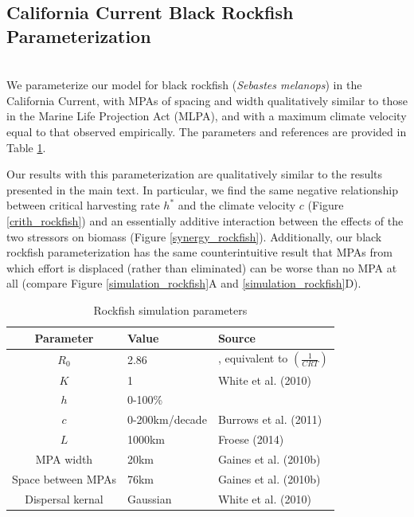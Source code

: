 \documentclass[12pt,english]{article}
\begin{document}
\subsection{California Current Black Rockfish Parameterization \label{rock}}
~\\We parameterize our model for black rockfish (\emph{Sebastes melanops}) in the California Current, with MPAs of spacing and width qualitatively similar to those in the Marine Life Projection Act (MLPA), and with a maximum climate velocity equal to that observed empirically. The parameters and references are provided in Table \ref{rockfish_params}.

Our results with this parameterization are qualitatively similar to the results presented in the main text. In particular, we find the same negative relationship between critical harvesting rate $h^*$ and the climate velocity $c$ (Figure \ref{crith_rockfish}) and an essentially additive interaction between the effects of the two stressors on biomass (Figure \ref{synergy_rockfish}). Additionally, our black rockfish parameterization has the same counterintuitive result that MPAs from which effort is displaced (rather than eliminated) can be worse than no MPA at all (compare Figure \ref{simulation_rockfish}A and \ref{simulation_rockfish}D). 

\begin{table}[htdp]
\caption{\label{rockfish_params} Rockfish simulation parameters}
\begin{center}
\begin{tabular}{c l l}
\hline
Parameter & Value & Source\\
\hline
$R_0$ & 2.86 & , equivalent to $\left(\frac{1}{CRT}\right)$ \\
$K$ & 1 & White et al. (2010) \\
$h$ & 0-100\% &\\
$c$ & 0-200km/decade & Burrows et al. (2011)\\
$L$ & 1000km  & Froese (2014) \\
MPA width & 20km & Gaines et al. (2010b) \\
Space between MPAs & 76km & Gaines et al. (2010b) \\
Dispersal kernal &  Gaussian & White et al. (2010)\\
\hline
\end{tabular}
\end{center}
\end{table}
\end{document}
